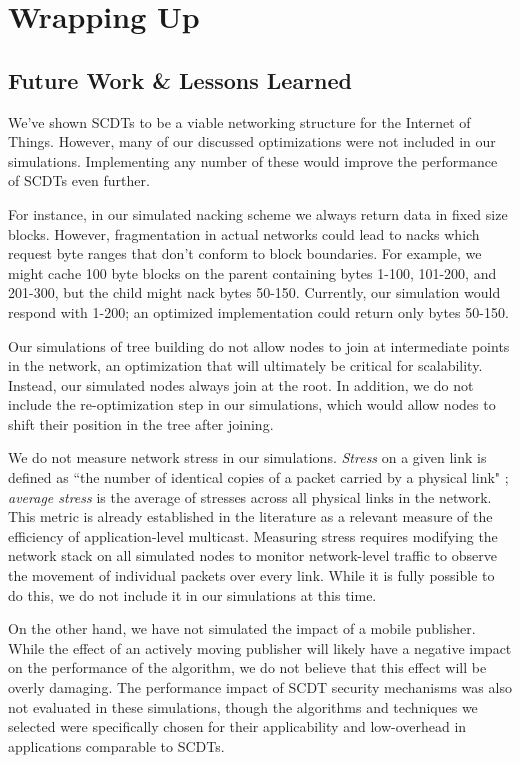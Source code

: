 \chapter{Wrapping Up}

\section{Future Work \& Lessons Learned}
\label{future}
We've shown SCDTs to be a viable networking structure for the Internet of Things. However, many of our discussed optimizations were not included in our simulations. Implementing any number of these would improve the performance of SCDTs even further. 

For instance, in our simulated nacking scheme we always return data in fixed size blocks. However, fragmentation in actual networks could lead to nacks which request byte ranges that don't conform to block boundaries. For example, we might cache 100 byte blocks on the parent containing bytes 1-100, 101-200, and 201-300, but the child might nack bytes 50-150.  Currently, our simulation would respond with 1-200; an optimized implementation could return only bytes 50-150.

Our simulations of tree building do not allow nodes to join at intermediate points in the network, an optimization that will ultimately be critical for scalability. Instead, our simulated nodes always join at the root. In addition, we do not include the re-optimization step in our simulations, which would allow nodes to shift their position in the tree after joining.

We do not measure network stress in our simulations. \textit{Stress} on a given link is defined as ``the number of identical copies of a packet carried by a physical link" \cite{narada}; \textit{average stress} is the average of stresses across all physical links in the network. This metric is already established in the literature as a relevant measure of the efficiency of application-level multicast. Measuring stress requires modifying the network stack on all simulated nodes to monitor network-level traffic to observe the movement of individual packets over every link. While it is fully possible to do this, we do not include it in our simulations at this time.

On the other hand, we have not simulated the impact of a mobile publisher. While the effect of an actively moving publisher will likely have a negative impact on the performance of the algorithm, we do not believe that this effect will be overly damaging. The performance impact of SCDT security mechanisms was also not evaluated in these simulations, though the algorithms and techniques we selected were specifically chosen for their applicability and low-overhead in applications comparable to SCDTs.

